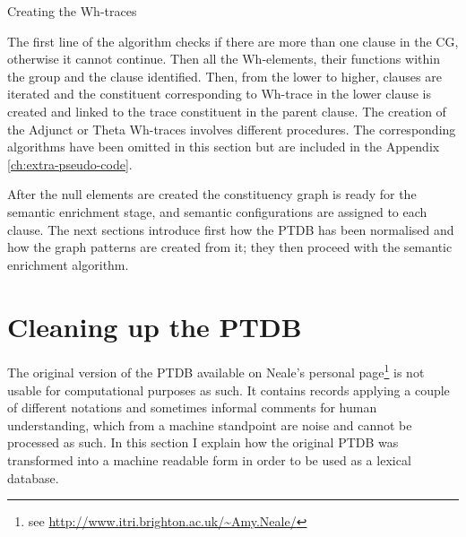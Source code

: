     \begin{algorithm}[!ht]
    	\Input { \cg}
    	\caption{Creating the Wh-traces}
    	\label{alg:create-wh-trace}
    \end{algorithm}

    The first line of the algorithm checks if there are more than one clause in the CG, otherwise it cannot continue. Then all the Wh-elements, their functions within the group and the clause identified. Then, from the lower to higher, clauses are iterated and the constituent corresponding to Wh-trace in the lower clause is created and linked to the trace constituent in the parent clause. The creation of the Adjunct or Theta Wh-traces involves different procedures. The corresponding algorithms have been omitted in this section but are included in the Appendix \ref{ch:extra-pseudo-code}. 

    After the null elements are created the constituency graph is ready for the semantic enrichment stage, and semantic configurations are assigned to each clause. The next sections introduce first how the PTDB has been normalised and how the graph patterns are created from it; they then proceed with the semantic enrichment algorithm.

\section{Cleaning up the PTDB}
\label{sec:claning-ptdb}

    The original version of the PTDB available on Neale's personal page\footnote{see \url{http://www.itri.brighton.ac.uk/~Amy.Neale/}} is not usable for computational purposes as such. It  contains records applying a couple of different notations and sometimes informal comments for human understanding, which from a machine standpoint are noise and cannot be processed as such. In this section I explain how the original PTDB was transformed into a machine readable form in order to be used as a lexical database.


